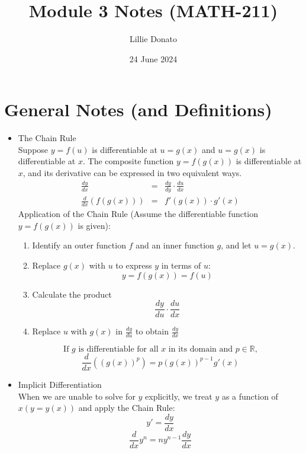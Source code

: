\documentclass{article}
\title{Module 3 Notes (MATH-211)}
\author{Lillie Donato}
\date{24 June 2024}
\begin{document}
\maketitle

\section*{General Notes (and Definitions)}
\begin{itemize}
    \item The Chain Rule
        \\ Suppose $y = f(u)$ is differentiable at $u = g(x)$ and $u = g(x)$ is differentiable at $x$. The composite function $y = f(g(x))$ is differentiable at $x$, and its derivative can be expressed in two equivalent ways.
        \begin{eqnarray}
            \frac{dy}{dx} &=& \frac{dy}{dy} \cdot \frac{du}{dx} \\
            \frac{d}{dx}\left(f\left(g\left(x\right)\right)\right) &=& f'\left(g\left(x\right)\right) \cdot g'\left(x\right)
        \end{eqnarray}
        Application of the Chain Rule (Assume the differentiable function $y = f(g(x))$ is given):
        \begin{enumerate}
            \item Identify an outer function $f$ and an inner function $g$, and let $u = g(x)$.
            \item Replace $g(x)$ with $u$ to express $y$ in terms of $u$:
            $$y = f(g(x)) = f(u)$$
            \item Calculate the product
            $$\frac{dy}{du} \cdot \frac{du}{dx}$$
            \item Replace $u$ with $g(x)$ in $\frac{dy}{du}$ to obtain $\frac{dy}{dx}$
        \end{enumerate}
        $$\text{If } g \text{ is differentiable for all } x \text{ in its domain and } p \in \mathbb{R} \text{,}$$
        $$\frac{d}{dx}\left(\left(g\left(x\right)\right)^p\right) = p\left(g\left(x\right)\right)^{p - 1}g'\left(x\right)$$
    \item Implicit Differentiation
    \\ When we are unable to solve for $y$ explicitly, we treat $y$ as a function of $x \left(y = y(x)\right)$ and apply the Chain Rule:
    $$y' = \frac{dy}{dx}$$
    $$\frac{d}{dx}y^n = ny^{n - 1}\frac{dy}{dx}$$
\end{itemize}
\end{document}
